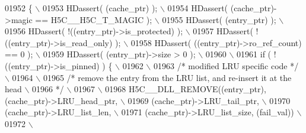 \begin{DoxyCode}
01952 \textcolor{preprocessor}{\{                                                                           \(\backslash\)}
01953 \textcolor{preprocessor}{    HDassert( (cache\_ptr) );                                                \(\backslash\)}
01954 \textcolor{preprocessor}{    HDassert( (cache\_ptr)->magic == H5C\_\_H5C\_T\_MAGIC );                     \(\backslash\)}
01955 \textcolor{preprocessor}{    HDassert( (entry\_ptr) );                                                \(\backslash\)}
01956 \textcolor{preprocessor}{    HDassert( !((entry\_ptr)->is\_protected) );                               \(\backslash\)}
01957 \textcolor{preprocessor}{    HDassert( !((entry\_ptr)->is\_read\_only) );                               \(\backslash\)}
01958 \textcolor{preprocessor}{    HDassert( ((entry\_ptr)->ro\_ref\_count) == 0 );                           \(\backslash\)}
01959 \textcolor{preprocessor}{    HDassert( (entry\_ptr)->size > 0 );                                      \(\backslash\)}
01960 \textcolor{preprocessor}{                                                                            \(\backslash\)}
01961 \textcolor{preprocessor}{    if ( ! ((entry\_ptr)->is\_pinned) ) \{                                     \(\backslash\)}
01962 \textcolor{preprocessor}{                                                                            \(\backslash\)}
01963 \textcolor{preprocessor}{        }\textcolor{comment}{/* modified LRU specific code */}\textcolor{preprocessor}{                                    \(\backslash\)}
01964 \textcolor{preprocessor}{                                                                            \(\backslash\)}
01965 \textcolor{preprocessor}{        }\textcolor{comment}{/* remove the entry from the LRU list, and re-insert it at the head \(\backslash\)}
01966 \textcolor{comment}{     */}\textcolor{preprocessor}{                                                                 \(\backslash\)}
01967 \textcolor{preprocessor}{                                                                            \(\backslash\)}
01968 \textcolor{preprocessor}{        H5C\_\_DLL\_REMOVE((entry\_ptr), (cache\_ptr)->LRU\_head\_ptr,             \(\backslash\)}
01969 \textcolor{preprocessor}{                        (cache\_ptr)->LRU\_tail\_ptr,                          \(\backslash\)}
01970 \textcolor{preprocessor}{            (cache\_ptr)->LRU\_list\_len,                          \(\backslash\)}
01971 \textcolor{preprocessor}{                        (cache\_ptr)->LRU\_list\_size, (fail\_val))             \(\backslash\)}
01972 \textcolor{preprocessor}{                                                                            \(\backslash\)}

\end{DoxyCode}
